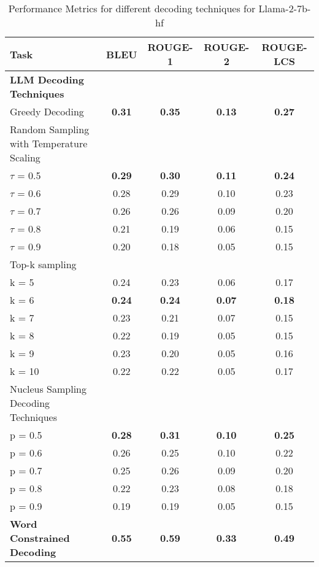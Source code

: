 \documentclass{article}
\begin{document}
\newpage
\begin{table}[h!]
\begin{center}
\begin{tabular}{|l||c c c c||} 
\hline
Task & BLEU & ROUGE-1 & ROUGE-2 & ROUGE-LCS \\ [0.5ex] 
\hline\hline
\textbf{LLM Decoding Techniques} & & & & \\ \hline
Greedy Decoding  & \textbf{0.31} & \textbf{0.35} & \textbf{0.13} & \textbf{0.27} \\ 
\hdashline
Random Sampling with Temperature Scaling & & & &\\ 
$\tau$ = 0.5 & \textbf{0.29} & \textbf{0.30} & \textbf{0.11} & \textbf{0.24} \\ 
$\tau$ = 0.6 & 0.28 & 0.29 & 0.10 & 0.23 \\ 
$\tau$ = 0.7 & 0.26 & 0.26 & 0.09 & 0.20 \\ 
$\tau$ = 0.8 & 0.21 & 0.19 & 0.06 & 0.15 \\ 
$\tau$ = 0.9 & 0.20 & 0.18 & 0.05 & 0.15 \\ 
\hdashline 
Top-k sampling & & & &\\ 
k = 5 & 0.24 & 0.23 & 0.06 & 0.17 \\ 
k = 6 & \textbf{0.24} & \textbf{0.24} & \textbf{0.07} & \textbf{0.18} \\ 
k = 7 & 0.23 & 0.21 & 0.07 & 0.15 \\ 
k = 8 & 0.22 & 0.19 & 0.05 & 0.15 \\ 
k = 9 & 0.23 & 0.20 & 0.05 & 0.16 \\ 
k = 10 & 0.22 & 0.22 & 0.05 & 0.17 \\ 
\hdashline
Nucleus Sampling Decoding Techniques & & & &\\ 
p = 0.5 & \textbf{0.28} & \textbf{0.31} & \textbf{0.10} & \textbf{0.25} \\ 
p = 0.6 & 0.26 & 0.25 & 0.10 & 0.22 \\ 
p = 0.7 & 0.25 & 0.26 & 0.09 & 0.20 \\ 
p = 0.8 & 0.22 & 0.23 & 0.08 & 0.18 \\ 
p = 0.9 & 0.19 & 0.19 & 0.05 & 0.15 \\ 
\hline \hline
\textbf{Word Constrained Decoding} & \textbf{0.55} & \textbf{0.59} & \textbf{0.33} & \textbf{0.49} \\ \hline
\end{tabular}
\end{center}
\caption{Performance Metrics for different decoding techniques for Llama-2-7b-hf}
\end{table}
\end{document}
